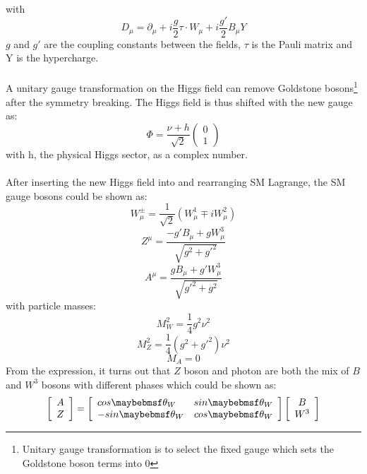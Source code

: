 with
\begin{equation}
 D_\mu = \partial_\mu+i\frac{g}{2}\tau\cdot W_\mu+i\frac{g'}{2}B_\mu Y
 \label{Eq:electroweak symmetry Lagrange}  
\end{equation}
$g$ and $g'$ are the coupling constants between the fields, $\tau$ is the Pauli matrix and Y is the hypercharge.
\\
\\A unitary gauge transformation on the Higgs field can remove Goldstone bosons\footnote{Unitary gauge transformation is to select the fixed gauge which sets the Goldstone boson terms into 0} after the symmetry breaking. The Higgs field is thus shifted with the new gauge as:
\begin{equation}
\Phi=\frac{\nu+h}{\sqrt{2}}\left ( \begin{array}{c} 0 \\ 1 \end{array} \right)
\end{equation}
with h, the physical Higgs sector, as a complex number.
\\
\\After inserting the new Higgs field into and rearranging SM Lagrange, the SM gauge bosons could be shown as:  
\begin{equation}
W^{\pm}_\mu=\frac{1}{\sqrt{2}}(W^{1}_\mu\mp iW^{2}_\mu) 
\end{equation}
\begin{equation}
Z^\mu=\frac{-g'B_\mu+gW^3_\mu}{\sqrt{g^2+g'^2}} 
\end{equation}
\begin{equation}
A^\mu=\frac{gB_\mu+g'W^3_\mu}{\sqrt{g'^2+g^2}} 
\end{equation}
with particle masses:
\begin{equation}
M^2_W=\frac{1}{4}g^2\nu^2 
\end{equation}
\begin{equation}
M^2_Z =\frac{1}{4}(g^2+g'^2)\nu^2 
\end{equation}
\begin{equation}
M_A=0 
\end{equation}
From the expression, it turns out that $Z$ boson and photon are both the mix of $B$ and $W^3$ bosons with different phases which could be shown as:
\begin{equation}
 \left[ \begin{array}{c}  A \\ Z \end{array} \right]=\left[ \begin{array}{l r} cos\theta_W &  sin\theta_W \\ -sin\theta_W & cos\theta_W \end{array} \right]\left[ \begin{array}{c}  B\\ W^3 \end{array} \right] 
  \label{Eq:AZ phase}  
\end{equation}
